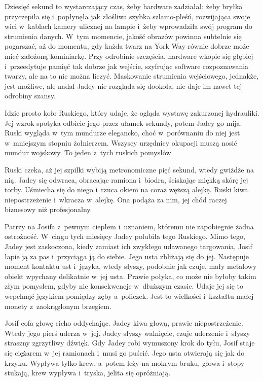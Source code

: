 \documentclass[oneside,polish,12pt,sfheadings]{mwbk}
\begin{document}
Dziesięć sekund to wystarczający czas, żeby hardware zadziałał: żeby
bryłka przyczepiła się i~popłynęła jak złośliwa szybka szlamo-pleśń,
rozwijająca swoje wici w~kablach kamery ulicznej na lampie i~żeby
wprowadziła swój program do strumienia danych. W~tym momencie, jakość
obrazów powinna subtelnie się pogarszać, aż do momentu, gdy każda twarz
na York Way równie dobrze może mieć założoną kominiarkę. Przy odrobinie
szczęścia, hardware wkopie się głębiej i~przeedytuje pamięć tak dobrze
jak wejście, szyfrując software rozpoznawania twarzy, ale na to nie
można liczyć. Maskowanie strumienia wejściowego, jednakże, jest możliwe,
ale nadal Jadey nie rozgląda się dookoła, nie daje im nawet tej odrobiny
szansy.

Idzie prosto koło Ruskiego, który udaje, że ogląda wystawę zakurzonej
hydrauliki. Jej wzrok spotyka odbicie jego przez ułamek sekundy, potem
Jadey go mija. Ruski wygląda w~tym mundurze elegancko, choć w~porównaniu
do niej jest w~mniejszym stopniu żołnierzem. Wszyscy urzędnicy okupacji
muszą nosić mundur wojskowy. To jeden z~tych ruskich pomysłów.

Ruski czeka, aż jej szpilki wybiją metronomiczne pięć sekund, wtedy
gwiżdże na nią. Jadey się odwraca, obracając ramiona i~biodra, ściskając
miękką skórę jej torby. Uśmiecha się do niego i~rzuca okiem na coraz
węższą alejkę. Ruski kiwa niepostrzeżenie i~wkracza w~alejkę. Ona podąża
za nim, jej chód raczej biznesowy niż profesjonalny.

Patrzy na Josifa z~pewnym ciepłem i~uznaniem, któremu nie zapobiegnie
żadna ostrożność. W~ciągu tych miesięcy Jadey polubiła tego Ruskiego.
Mimo tego, Jadey jest zaskoczona, kiedy zamiast ich zwykłego udawanego
targowania, Josif łapie ją za pas i~przyciąga ją do siebie. Jego usta
zbliżają się do jej. Następuje moment kontaktu ust i~języka, wtedy
słyszy, podobnie jak czuje, mały metalowy obiekt wpychany delikatnie w~jej usta. Prawie połyka, co może nie byłoby takim złym pomysłem, gdyby
nie konsekwencje w~dłuższym czasie. Udaje jej się to wepchnąć
językiem pomiędzy zęby a~policzek. Jest to wielkości i~kształtu małej
monety z~zaokrąglonym brzegiem.

Josif cofa głowę cicho oddychając. Jadey kiwa głową, prawie
niepostrzeżenie. Wtedy jego pierś uderza w~jej, Jadey słyszy walnięcie,
czuje uderzenie i~słyszy straszny zgrzytliwy dźwięk. Gdy Jadey robi
wymuszony krok do tyłu, Josif staje się ciężarem w~jej ramionach i~musi
go puścić. Jego usta otwierają się jak do krzyku. Wypływa tylko krew, a~potem leży na mokrym bruku, głowa i~stopy stukają, krew wypływa i~tryska, jelita się opróżniają.
\end{document}
